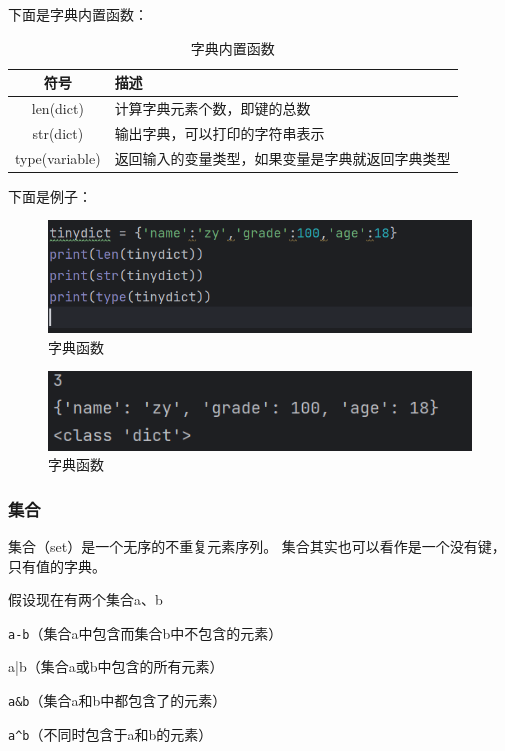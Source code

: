 \documentclass{ctexart}
\begin{document}
	下面是字典内置函数：
	
	\begin{table}[h]
		\centering
		\caption{字典内置函数}
		\begin{tabular}{|c|p{10cm}|}
			\hline
			符号 & 描述  \\
			\hline
			len(dict) & 计算字典元素个数，即键的总数 \\
			\hline
			str(dict) & 输出字典，可以打印的字符串表示\\
			\hline
			type(variable) &返回输入的变量类型，如果变量是字典就返回字典类型\\ 
			\hline
		\end{tabular}
	\end{table}
	
	下面是例子：
	\begin{figure}[H]
		\centering
		\includegraphics[scale=0.5]{3.49}
		\caption{字典函数}
	\end{figure}
	
		\begin{figure}[H]
		\centering
		\includegraphics[scale=0.5]{3.50}
		\caption{字典函数}
	\end{figure}
	
	\subsubsection{集合}
	集合（set）是一个无序的不重复元素序列。
	集合其实也可以看作是一个没有键，只有值的字典。
	
	假设现在有两个集合a、b
	
	\verb|a-b|（集合a中包含而集合b中不包含的元素）
	
	a|b（集合a或b中包含的所有元素）
	
	\verb|a&b|（集合a和b中都包含了的元素）
	
	\verb|a^b|（不同时包含于a和b的元素）
	
\end{document}
